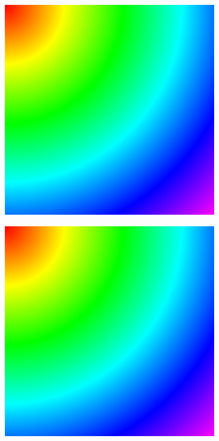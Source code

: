 \documentclass[11pt]{article}       %
\begin{document}
\begin{figure}%
	\centering
	\begin{subfigure}[b]{.3\columnwidth}
		\includegraphics[width=\textwidth]{Figures/fmm_constant}
	\end{subfigure}
	\begin{subfigure}[b]{.3\columnwidth}
		\includegraphics[width=\textwidth]{Figures/fim_constant}

\end{subfigure}
\end{figure}
\end{document}

